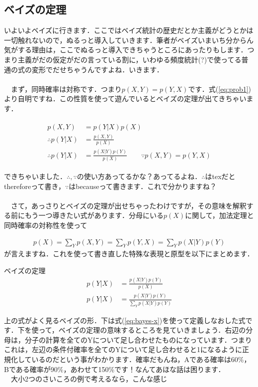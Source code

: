 \documentclass[11pt,a4paper]{jsarticle}                    %
\begin{document}
\subsection{ベイズの定理}
いよいよベイズに行きます．ここではベイズ統計の歴史だとか主義がどうとかは一切触れないので，ぬるっと導入していきます．筆者がベイズいまいち分からん気がする理由は，ここでぬるっと導入できちゃうところにあったりもします．つまり主義がだの仮定がだの言っている割に，いわゆる頻度統計(?)で使ってる普通の式の変形でだせちゃうんですよね．いきます．\\
\\
　まず，同時確率は対称です．つまり$p(X,Y) = p(Y,X)$です．式(\ref{eq:prob1})より自明ですね．この性質を使って遊んでいるとベイズの定理が出てきちゃいます．

\begin{eqnarray}
\label{eq:bayes}
\begin{split}
p(X, Y) &= p(Y|X)p(X)　\\
\therefore p(Y|X) &= \frac{p(X,Y)}{p(X)}  \\
\therefore p(Y|X) &= \frac{p(X|Y)p(Y)}{p(X)} \qquad \because p(X,Y) = p(Y, X)
\end{split}
\end{eqnarray}

できちゃいました．$\therefore, \because$の使い方あってるかな？あってるよね．$\therefore$はtexだとthereforeって書き，$\because$はbecauseって書きます．これで分かりますね？\\
\\
　さて，あっさりとベイズの定理が出せちゃったわけですが，その意味を解釈する前にもう一つ導きたい式があります．分母にいる$p(X)$に関して，加法定理と同時確率の対称性を使って

\begin{eqnarray}
\label{eq:bayes-x}
p(X) = \sum_Y p(X,Y) = \sum_Y p(Y,X) = \sum_Y p(X|Y)p(Y)
\end{eqnarray}
が言えますね．これを使って書き直した特殊な表現と原型を以下にまとめます．

\begin{screen}
ベイズの定理
\begin{eqnarray}
p(Y|X) &= \frac{p(X|Y)p(Y)}{p(X)}\\
p(Y|X) &= \frac{p(X|Y)p(Y)}{\sum_Y p(X|Y)p(Y)}
\end{eqnarray}
\end{screen}

上の式がよく見るベイズの形．下は式(\ref{eq:bayes-x})を使って定義しなおした式です．下を使って，ベイズの定理の意味するところを見ていきましょう．右辺の分母は，分子の計算を全てのYについて足し合わせたものになっています．つまりこれは，左辺の条件付確率を全てのYについて足し合わせると1になるように正規化しているのだという事がわかります．確率だもんね，Aである確率は60\%，Bである確率が90\%，あわせて150\%です！なんてあほな話は困ります．\\
　大小2つのさいころの例で考えるなら，こんな感じ
\end{document}
